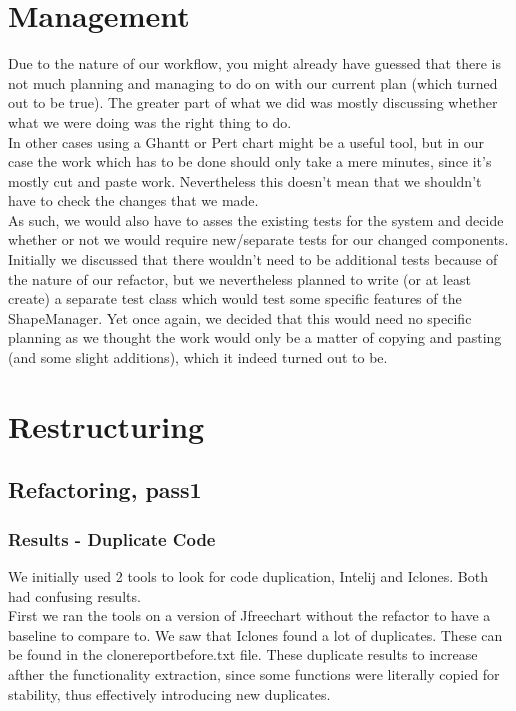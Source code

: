 \documentclass{article}
\begin{document}
\section{Management}

Due to the nature of our workflow, you might already have guessed that there is not much planning and managing to do on with our current plan (which turned out to be true). The greater part of what we did was mostly discussing whether what we were doing was the right thing to do.\\

In other cases using a Ghantt or Pert chart might be a useful tool, but in our case the work which has to be done should only take a mere minutes, since it's mostly cut and paste work. Nevertheless this doesn't mean that we shouldn't have to check the changes that we made.\\

As such, we would also have to asses the existing tests for the system and decide whether or not we would require new/separate tests for our changed components. Initially we discussed that there wouldn't need to be additional tests because of the nature of our refactor, but we nevertheless planned to write (or at least create) a separate test class which would test some specific features of the ShapeManager. Yet once again, we decided that this would need no specific planning as we thought the work would only be a matter of copying and pasting (and some slight additions), which it indeed turned out to be.

\section{Restructuring}

\subsection{Refactoring, pass1}

\subsubsection{Results - Duplicate Code}

We initially used 2 tools to look for code duplication, Intelij and Iclones. Both had confusing results.\\

First we ran the tools on a version of Jfreechart without the refactor to have a baseline to compare to. We saw that Iclones found a lot of duplicates. These can be found in the clonereportbefore.txt file. These duplicate results to increase afther the functionality extraction, since some functions were literally copied for stability, thus effectively introducing new duplicates.\\
\end{document}
